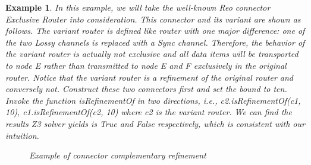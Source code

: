 \documentclass[3p,times]{elsarticle}
\newtheorem{example}{Example}[section]
\begin{document}
\begin{example}
In this example, we will take the well-known Reo connector \emph{Exclusive Router} into consideration. This connector and its variant are shown as follows. The \emph{variant router} is defined like \emph{router} with one major difference: one of the two \emph{Lossy} channels is replaced with a \emph{Sync} channel. Therefore, the behavior of the variant router is actually not exclusive and all data items will be transported to node \emph{E} rather than transmitted to node \emph{E} and \emph{F} exclusively in the original router. Notice that the variant router is a refinement of the original router and conversely not. Construct these two connectors first and set the bound to ten. Invoke the function \emph{isRefinementOf} in two directions, i.e., \emph{c2.isRefinementOf(c1, 10), c1.isRefinementOf(c2, 10)} where \emph{c2} is the variant router. We can find the results Z3 solver yields is \emph{True} and \emph{False} respectively, which is consistent with our intuition.
\begin{figure}
\centering
{}
\caption{Example of connector complementary refinement }
\end{figure}


\end{example}
\end{document}
